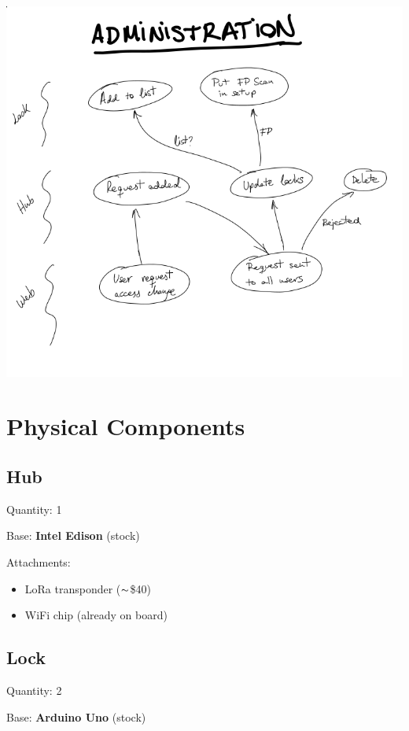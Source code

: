 \documentclass{article}
\begin{document}
\includegraphics[scale=0.4]{admin_graph.png}

\section{Physical Components}


\subsection{Hub}

\noindent
Quantity: 1

\noindent
Base: \textbf{Intel Edison} (stock)

\noindent
Attachments:
\begin{itemize}

  \item LoRa transponder ($\thicksim$\$40)

  \item WiFi chip (already on board)

\end{itemize}

\subsection{Lock}

\noindent
Quantity: 2

\noindent
Base: \textbf{Arduino Uno} (stock)
\end{document}
